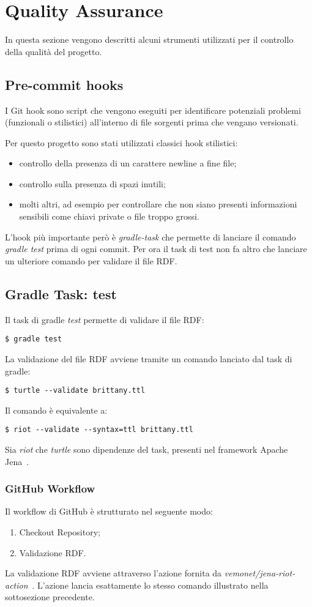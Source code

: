 \section{Quality Assurance}
In questa sezione vengono descritti alcuni strumenti utilizzati per il controllo della qualità del progetto.

\subsection{Pre-commit hooks}
I Git hook sono script che vengono eseguiti per identificare potenziali problemi (funzionali o stilistici) all'interno di file sorgenti prima che vengano versionati.\newline

\noindent Per questo progetto sono stati utilizzati classici hook stilistici:
\begin{itemize}
	\item controllo della presenza di un carattere newline a fine file;
	\item controllo sulla presenza di spazi inutili;
	\item molti altri, ad esempio per controllare che non siano presenti informazioni sensibili come chiavi private o file troppo grossi.
\end{itemize}

\noindent L'hook più importante però è \textit{gradle-task} che permette di lanciare il comando \textit{gradle test} prima di ogni commit.
Per ora il task di test non fa altro che lanciare un ulteriore comando per validare il file RDF.

\subsection{Gradle Task: test}
Il task di gradle \textit{test} permette di validare il file RDF:
\begin{verbatim}
$ gradle test
\end{verbatim}
La validazione del file RDF avviene tramite un comando lanciato dal task di gradle:
\begin{verbatim}
$ turtle --validate brittany.ttl
\end{verbatim}
Il comando è equivalente a:
\begin{verbatim}
$ riot --validate --syntax=ttl brittany.ttl
\end{verbatim}
Sia \textit{riot} che \textit{turtle} sono dipendenze del task, presenti nel framework Apache Jena~\cite{ApacheJe75:online}.

\subsubsection{GitHub Workflow}
Il workflow di GitHub è strutturato nel seguente modo:
\begin{enumerate}
	\item Checkout Repository;
	\item Validazione RDF.
\end{enumerate}

\noindent La validazione RDF avviene attraverso l'azione fornita da \textit{vemonet/jena-riot-action}~\cite{vemonetj43:online}. L'azione lancia esattamente lo stesso comando illustrato nella sottosezione precedente.
